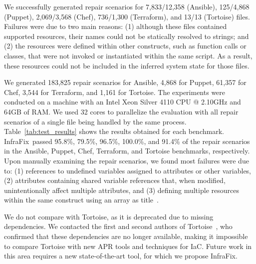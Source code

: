 \documentclass[sigconf,nonacm]{acmart}
\def\name{{\sc InfraFix}}
\begin{document}


We successfully generated repair scenarios for 7,833/12,358 (Ansible), 125/4,868 (Puppet), 2,069/3,568 (Chef), 736/1,300 (Terraform), and 13/13 (Tortoise) files.
Failures were due to two main reasons: (1) although these files contained supported resources, their names could not be statically resolved to strings; and (2) the resources were defined within other constructs, such as function calls or classes, that were not invoked or instantiated within the same script. As a result, these resources could not be included in the inferred system state for those files.

We generated 183,825 repair scenarios for Ansible, 4,868 for Puppet, 61,357 for Chef, 3,544 for Terraform, and 1,161 for Tortoise. The experiments were conducted on a machine with an Intel Xeon Silver 4110 CPU @ 2.10GHz and 64GB of RAM. We used 32 cores to parallelize the evaluation with all repair scenarios of a single file being handled by the same process.
Table~\ref{tab:test_results} shows the results obtained for each benchmark. 
%
\name\ passed 95.8\%, 79.5\%, 96.5\%, 100.0\%, and 91.4\% of the repair scenarios in the Ansible, Puppet, Chef, Terraform, and Tortoise benchmarks, respectively.
Upon manually examining the repair scenarios, we found most failures were due to: (1) references to undefined variables assigned to attributes or other variables, (2) attributes containing shared variable references that, when modified, unintentionally affect multiple attributes, and (3) defining multiple resources within the same construct using an array as title~\cite{array_titles_puppet_2025}.

We do not compare with Tortoise, as it is deprecated due to missing dependencies. We contacted the first and second authors of Tortoise~\cite{weiss2017tortoise}, who confirmed that these dependencies are no longer available, making it impossible to compare Tortoise with new APR tools and techniques for IaC. Future work in this area requires a new state-of-the-art tool, for which we propose \name.
\end{document}
